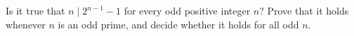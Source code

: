 Is it true that $n\mid2^{n-1}-1$ for every odd positive integer $n$? Prove that it holds whenever $n$ is an odd prime, and decide whether it holds for all odd $n$.
